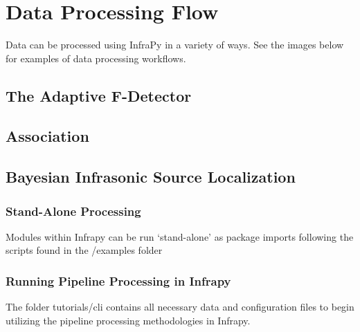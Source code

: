 \documentclass[letterpaper,10pt,english]{sphinxmanual}
\begin{document}
\section{Data Processing Flow}
\label{\detokenize{processing_model:data-processing-flow}}\label{\detokenize{processing_model:dataprocess}}\label{\detokenize{processing_model::doc}}
Data can be processed using InfraPy in a variety of ways.  See the images below for examples of data processing workflows.


\subsection{The Adaptive F-Detector}
\label{\detokenize{processing_model:afd}}
\noindent{}


\subsection{Association}
\label{\detokenize{processing_model:association}}
\noindent{}


\subsection{Bayesian Infrasonic Source Localization}
\label{\detokenize{processing_model:localization}}
\noindent{}


\subsubsection{Stand-Alone Processing}
\label{\detokenize{standalone:stand-alone-processing}}\label{\detokenize{standalone:standalone}}\label{\detokenize{standalone::doc}}
Modules within Infrapy can be run ‘stand-alone’ as package imports following the scripts found in the /examples folder


\subsubsection{Running Pipeline Processing in Infrapy}
\label{\detokenize{pipeline:running-pipeline-processing-in-infrapy}}\label{\detokenize{pipeline:pipeline}}\label{\detokenize{pipeline::doc}}
The folder tutorials/cli contains all necessary data and configuration files to begin utilizing the pipeline processing methodologies in Infrapy.
\end{document}
